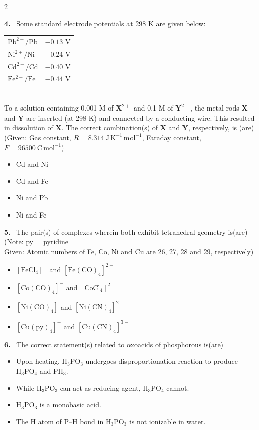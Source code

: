 \documentclass[10pt]{extarticle}
\newcommand{\qn}[1]{\par\smallskip\noindent\textbf{#1.}~}
\newenvironment{qoptions}{\begin{itemize}[leftmargin=1.8em,itemsep=1pt,topsep=2pt,label={}]}{\end{itemize}}
\newcommand{\opt}[2]{\item[(#1)] #2}
\begin{document}
\begin{multicols}{2}
\qn{4} Some standard electrode potentials at 298 K are given below:\\
\begin{tabular}{@{}ll@{}}
$\mathrm{Pb^{2+}/Pb}$ & $-0.13$ V\\
$\mathrm{Ni^{2+}/Ni}$ & $-0.24$ V\\
$\mathrm{Cd^{2+}/Cd}$ & $-0.40$ V\\
$\mathrm{Fe^{2+}/Fe}$ & $-0.44$ V
\end{tabular}\\[2pt]
To a solution containing 0.001 M of $\mathbf X^{2+}$ and 0.1 M of $\mathbf Y^{2+}$, the metal rods $\mathbf X$ and $\mathbf Y$ are inserted (at 298 K) and connected by a conducting wire. This resulted in dissolution of $\mathbf X$. The correct combination(s) of $\mathbf X$ and $\mathbf Y$, respectively, is (are)\\
(Given: Gas constant, $R=8.314\ \mathrm{J\,K^{-1}\,mol^{-1}}$, Faraday constant, $F=96500\ \mathrm{C\,mol^{-1}}$)
\begin{qoptions}
\opt{A}{Cd and Ni}
\opt{B}{Cd and Fe}
\opt{C}{Ni and Pb}
\opt{D}{Ni and Fe}
\end{qoptions}

\qn{5} The pair(s) of complexes wherein both exhibit tetrahedral geometry is(are)\\
(Note: py = pyridine\\
Given: Atomic numbers of Fe, Co, Ni and Cu are 26, 27, 28 and 29, respectively)
\begin{qoptions}
\opt{A}{$[\mathrm{FeCl_4}]^{-}$ and $[\mathrm{Fe(CO)_4}]^{2-}$}
\opt{B}{$[\mathrm{Co(CO)_4}]^{-}$ and $[\mathrm{CoCl_4}]^{2-}$}
\opt{C}{$[\mathrm{Ni(CO)_4}]$ and $[\mathrm{Ni(CN)_4}]^{2-}$}
\opt{D}{$[\mathrm{Cu(py)_4}]^{+}$ and $[\mathrm{Cu(CN)_4}]^{3-}$}
\end{qoptions}

\qn{6} The correct statement(s) related to oxoacids of phosphorous is(are)
\begin{qoptions}
\opt{A}{Upon heating, $\mathrm{H_3PO_3}$ undergoes disproportionation reaction to produce $\mathrm{H_3PO_4}$ and $\mathrm{PH_3}$.}
\opt{B}{While $\mathrm{H_3PO_3}$ can act as reducing agent, $\mathrm{H_3PO_4}$ cannot.}
\opt{C}{$\mathrm{H_3PO_3}$ is a monobasic acid.}
\opt{D}{The H atom of P--H bond in $\mathrm{H_3PO_3}$ is not ionizable in water.}
\end{qoptions}


\end{multicols}
\end{document}
